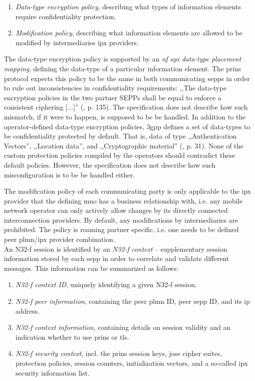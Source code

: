 \begin{enumerate}[label=--]
    \item \textit{Data-type encryption policy}, describing what types of information elements require confidentiality protection.
    \item \textit{Modification policy}, describing what information elements are allowed to be modified by intermediaries \gls{ipx} providers.
\end{enumerate}

The data-type encryption policy is supported by an \textit{\gls{nf} \gls{api} data-type placement mapping}, defining the data-type of a particular information element.
The \gls{prins} protocol expects this policy to be the same in both communicating \glspl{sepp} in order to rule out inconsistencies in confidentiality requirements:
,,The data-type encryption policies in the two partner SEPPs shall be equal to enforce a consistent ciphering [...]'' (\cite{3gpp.33.501}, p. 135).
The specification does not describe how such mismatch, if it were to happen, is supposed to be be handled.
In addition to the operator-defined data-type encryption policies, \gls{3gpp} defines a set of data-types to be confidentiality protected by default.
That is, data of type ,,Authentication Vectors'', ,,Location data'', and ,,Cryptographic material'' (\cite{3gpp.33.501}, p. 31).
None of the custom protection policies compiled by the operators should contradict these default policies.
However, the specification does not describe how such misconfiguration is to be be handled either.

The modification policy of each communicating party is only applicable to the \gls{ipx} provider that the defining \gls{mno} has a business relationship with, i.e. any mobile network operator can only actively allow changes by its directly connected interconnection providers.
By default, any modifications by intermediaries are prohibited.
The policy is roaming partner specific, i.e. one needs to be defined peer \gls{plmn}/\gls{ipx} provider combination.
\\

An N32-f session is identified by an \textit{N32-f context} -- supplementary session information stored by each \gls{sepp} in order to correlate and validate different messages.
This information can be summarized as follows:

\begin{enumerate}[label=--]
    \item \textit{N32-f context ID}, uniquely identifying a given N32-f session.
    \item \textit{N32-f peer information}, containing the peer \gls{plmn} ID, peer \gls{sepp} ID, and its \gls{ip} address.
    \item \textit{N32-f context information}, containing details on session validity and an indication whether to use \gls{prins} or \gls{tls}.
    \item \textit{N32-f security context}, incl. the \gls{prins} session keys, \gls{jose} cipher suites, protection policies, session counters, initialization vectors, and a so-called \gls{ipx} security information list.
\end{enumerate}

